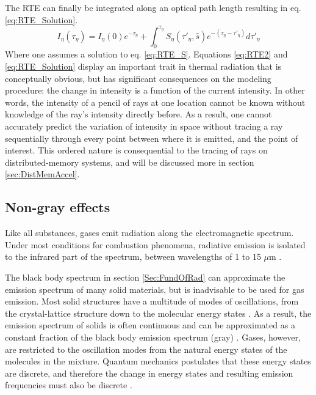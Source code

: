 The RTE can finally be integrated along an optical path length resulting in eq. \ref{eq:RTE_Solution}.
\begin{equation}
    I_\eta{}(\tau{}_\eta{}) = I_\eta{}(0)e^{-\tau{}_\eta{}}+\int_{0}^{\tau{}_\eta{}}{S_\eta{}(\tau{}'_\eta{},\hat{s})e^{-(\tau{}_\eta{}-\tau{}'_\eta{})}}d\tau{}'_\eta{}
    \label{eq:RTE_Solution}
\end{equation}
Where one assumes a solution to eq. \ref{eq:RTE_S}. Equations \ref{eq:RTE2} and \ref{eq:RTE_Solution} display an important trait in thermal radiation that is conceptually obvious, but has significant consequences on the modeling procedure:
the change in intensity is a function of the current intensity. In other words, the intensity of a pencil of rays at one location cannot be known without knowledge of the ray's intensity directly before.
As a result, one cannot accurately predict the variation of intensity in space without tracing a ray sequentially through every point between where it is emitted, and the point of interest.
This ordered nature is consequential to the tracing of rays on distributed-memory systems, and will be discussed more in section \ref{sec:DistMemAccel}.

\subsection{Non-gray effects}\label{Sec:Nongray}
Like all substances, gases emit radiation along the electromagnetic spectrum. Under most conditions for combustion phenomena, radiative emission is isolated to the infrared part of the spectrum, between wavelengths of 1 to 15 $\mu{}$m \cite{Liu2020TheFlames}.

The black body spectrum in section \ref{Sec:FundOfRad} can approximate the emission spectrum of many solid materials, but is inadvisable to be used for gas emission. 
Most solid structures have a multitude of modes of oscillations, from the crystal-lattice structure down to the molecular energy states \cite{Viskanta1975HeatSolids}. As a result, the emission spectrum of solids is often continuous and can be approximated as a constant fraction of the black body emission spectrum (gray) \cite{Howell2010ThermalTransfer}. 
Gases, however, are restricted to the oscillation modes from the natural energy states of the molecules in the mixture. Quantum mechanics postulates that these energy states are discrete, and therefore the change in energy states and resulting emission frequencies must also be discrete \cite{Hanson2016SpectroscopyGases}.

